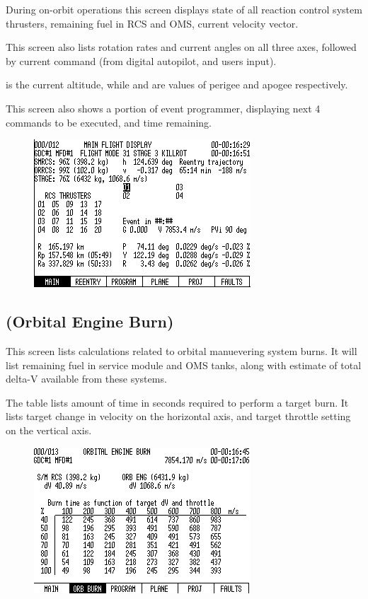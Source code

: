 During on-orbit operations this screen displays state of all reaction control system thrusters, remaining fuel in RCS and OMS, current velocity vector.

This screen also lists rotation rates and current angles on all three axes, followed by current command (from digital autopilot, and users input).

 is the current altitude, while  and  are values of perigee and apogee respectively.

This screen also shows a portion of event programmer, displaying next 4 commands to be executed, and time remaining.

\begin{figure}[htb]
\centering
\includegraphics[bb=0 0 9cm 7cm,scale=0.50]{../graphics/rv550_screen0.png}
\end{figure}

\subsection{ (Orbital Engine Burn)}
This screen lists calculations related to orbital manuevering system burns. It will list remaining fuel in service module and OMS tanks, along with estimate of total delta-V available from these systems.

The table lists amount of time in seconds required to perform a target burn. It lists target change in velocity on the horizontal axis, and target throttle setting on the vertical axis.

\begin{figure}[htb]
\centering
\includegraphics[bb=0 0 9cm 7cm,scale=0.50]{../graphics/rv550_screen9.png}
\end{figure}

